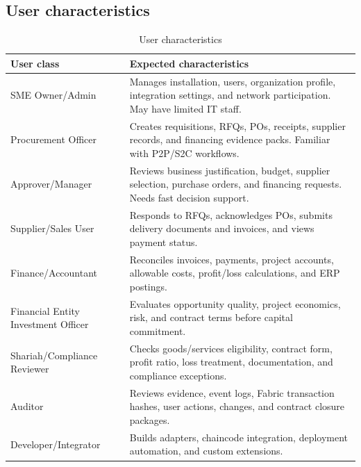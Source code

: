 \documentclass[11pt,a4paper]{article}
\begin{document}
\subsection{User characteristics}
\begin{table}[h]
\centering
\begin{tabularx}{\textwidth}{@{}lX@{}}
\toprule
User class & Expected characteristics \\
\midrule
SME Owner/Admin & Manages installation, users, organization profile, integration settings, and network participation. May have limited IT staff. \\
Procurement Officer & Creates requisitions, RFQs, POs, receipts, supplier records, and financing evidence packs. Familiar with P2P/S2C workflows. \\
Approver/Manager & Reviews business justification, budget, supplier selection, purchase orders, and financing requests. Needs fast decision support. \\
Supplier/Sales User & Responds to RFQs, acknowledges POs, submits delivery documents and invoices, and views payment status. \\
Finance/Accountant & Reconciles invoices, payments, project accounts, allowable costs, profit/loss calculations, and ERP postings. \\
Financial Entity Investment Officer & Evaluates opportunity quality, project economics, risk, and contract terms before capital commitment. \\
Shariah/Compliance Reviewer & Checks goods/services eligibility, contract form, profit ratio, loss treatment, documentation, and compliance exceptions. \\
Auditor & Reviews evidence, event logs, Fabric transaction hashes, user actions, changes, and contract closure packages. \\
Developer/Integrator & Builds adapters, chaincode integration, deployment automation, and custom extensions. \\
\bottomrule
\end{tabularx}
\caption{User characteristics}
\end{table}
\end{document}
